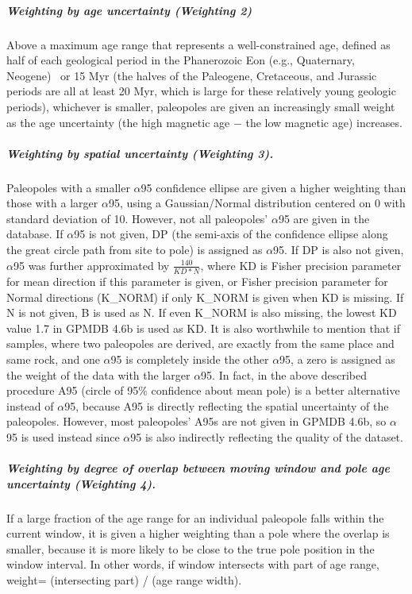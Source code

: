\subparagraph{Weighting by age uncertainty (Weighting 2)} Above a maximum age
range that represents a well-constrained age, defined as half of each geological
period in the Phanerozoic Eon (e.g., Quaternary, Neogene)~\cite{v90,T19} or 15
Myr (the halves of the Paleogene, Cretaceous, and Jurassic periods are all at
least 20 Myr, which is large for these relatively young geologic periods),
whichever is smaller, paleopoles are given an increasingly small weight as the
age uncertainty (the high magnetic age $-$ the low magnetic age) increases.

\subparagraph{Weighting by spatial uncertainty (Weighting 3).} Paleopoles with a
smaller $\alpha$95 confidence ellipse are given a higher weighting than those
with a larger $\alpha$95, using a Gaussian/Normal distribution centered on 0
with standard deviation of 10. However, not all paleopoles' $\alpha$95 are given
in the database. If $\alpha$95 is not given, DP (the semi-axis of the confidence
ellipse along the great circle path from site to pole) is assigned as
$\alpha$95. If DP is also not given, $\alpha$95 was further approximated by
$\frac{140}{KD*N}$, where KD is Fisher precision parameter for mean direction if
this parameter is given, or Fisher precision parameter for Normal directions
(K\_NORM) if only K\_NORM is given when KD is missing. If N is not given, B is
used as N. If even K\_NORM is also missing, the lowest KD value 1.7 in GPMDB
4.6b is used as KD\@. It is also worthwhile to mention that if samples, where
two paleopoles are derived, are exactly from the same place and same rock, and
one $\alpha$95 is completely inside the other $\alpha$95, a zero is assigned as
the weight of the data with the larger $\alpha$95. In fact, in the above
described procedure A95 (circle of 95\% confidence about mean pole) is a better
alternative instead of $\alpha$95, because A95 is directly reflecting the
spatial uncertainty of the paleopoles. However, most paleopoles' A95s are not
given in GPMDB 4.6b, so $\alpha$95 is used instead since $\alpha$95 is also
indirectly reflecting the quality of the dataset.

\subparagraph{Weighting by degree of overlap between moving window and pole age
uncertainty (Weighting 4).} If a large fraction of the age range for an
individual paleopole falls within the current window, it is given a higher
weighting than a pole where the overlap is smaller, because it is more likely
to be close to the true pole position in the window interval. In other words, if
window intersects with part of age range, weight= (intersecting part) / (age
range width).

